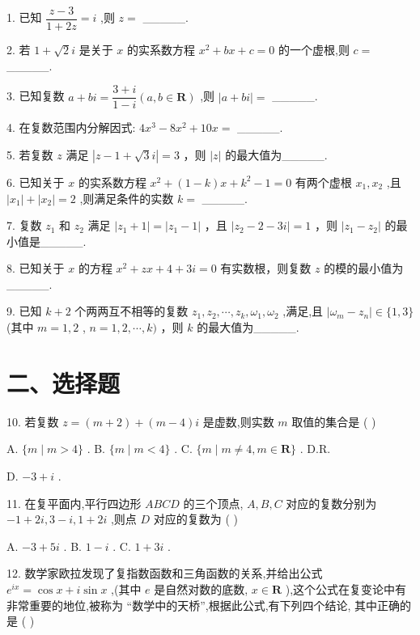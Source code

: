 1. 已知 $\dfrac{z - 3}{1 + {2z}} = {i}$ ,则 $z =$ \_\_\_\_\_.

2. 若 $1 + \sqrt{2}{i}$ 是关于 $x$ 的实系数方程 ${x}^{2} + {bx} + c = 0$ 的一个虚根,则 $c =$ \_\_\_\_\_.

3. 已知复数 $a + b{i} = \dfrac{3 + {i}}{1 - {i}}\left( {a,b \in  \mathbf{R}}\right)$ ,则 $\left| {a + b{i}}\right|  =$ \_\_\_\_\_.

4. 在复数范围内分解因式: $4{x}^{3} - 8{x}^{2} + {10x} =$ \_\_\_\_\_.

5. 若复数 $z$ 满足 $\left| {z - 1 + \sqrt{3}{i}}\right|  = 3$ ，则 $\left| z\right|$ 的最大值为\_\_\_\_\_.

6. 已知关于 $x$ 的实系数方程 ${x}^{2} + \left( {1 - k}\right) x + {k}^{2} - 1 = 0$ 有两个虚根 ${x}_{1},{x}_{2}$ ,且 $\left| {x}_{1}\right|  + \left| {x}_{2}\right|  = 2$ ,则满足条件的实数 $k =$ \_\_\_\_\_.

7. 复数 ${z}_{1}$ 和 ${z}_{2}$ 满足 $\left| {{z}_{1} + 1}\right|  = \left| {{z}_{1} - 1}\right|$ ，且 $\left| {{z}_{2} - 2 - {3{i}}}\right|  = 1$ ，则 $\left| {{z}_{1} - {z}_{2}}\right|$ 的最小值是\_\_\_\_\_.

8. 已知关于 $x$ 的方程 ${x}^{2} + {zx} + 4 + {3{i}} = 0$ 有实数根，则复数 $z$ 的模的最小值为\_\_\_\_\_.

9. 已知 $k + 2$ 个两两互不相等的复数 ${z}_{1},{z}_{2},\cdots ,{z}_{k},{\omega }_{1},{\omega }_{2}$ ,满足,且 $\left| {{\omega }_{m} - {z}_{n}}\right|  \in  \{ 1,3\}$ (其中 $m = 1,2$ , $n = 1,2,\cdots ,k)$ ，则 $k$ 的最大值为\_\_\_\_\_.

\section*{二、选择题}

10. 若复数 $z = \left( {m + 2}\right)  + \left( {m - 4}\right) {i}$ 是虚数,则实数 $m$ 取值的集合是 ( )

A. $\{ m \mid  m > 4\}$ . B. $\{ m \mid  m < 4\}$ . C. $\{ m \mid  m \neq  4,m \in  \mathbf{R}\}$ . D.R.

D. $- 3 + {i}$ .

11. 在复平面内,平行四边形 ${ABCD}$ 的三个顶点, $A,B,C$ 对应的复数分别为 $- 1 + 2{i},3 - {i},1 + 2{i}$ ,则点 $D$ 对应的复数为 ( )

A. $- 3 + 5{i}$ . B. $1 - {i}$ . C. $1 + 3{i}$ .


12. 数学家欧拉发现了复指数函数和三角函数的关系,并给出公式 ${{e}}^{{i}x} = \cos x + {i}\sin x$ ,(其中 ${e}$ 是自然对数的底数, $x \in  \mathbf{R}$ ),这个公式在复变论中有非常重要的地位,被称为 “数学中的天桥”,根据此公式,有下列四个结论, 其中正确的是 ( )

